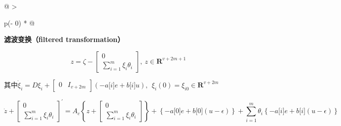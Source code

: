 \documentclass[
  12pt,
  a4paper
]{article}
\begin{document}
\begin{longtable}[]{@{}
  >{\raggedright\arraybackslash}p{}@{}}
\toprule\noalign{}
\begin{minipage}[b]{\linewidth}\raggedright
\textbf{滤波变换（filtered transformation）}

\[z = \zeta - \begin{bmatrix}
0 \\
\sum_{i = 1}^{m}{\xi_{i}\theta_{i}}
\end{bmatrix},\ z \in \mathbf{R}^{v + 2m + 1}\]

其中\({\dot{\xi}}_{i} = D\xi_{i} + \begin{bmatrix}
0 & I_{v + 2m}
\end{bmatrix}\left( - a\lbrack i\rbrack e + b\lbrack i\rbrack u \right),\ \ \xi_{i}(0) = \xi_{i0} \in \mathbf{R}^{v + 2m}\)

\[\dot{z} + \begin{bmatrix}
0 \\
\sum_{i = 1}^{m}{\xi_{i}\theta_{i}}
\end{bmatrix}^{'} = A_{c}\left\{ z + \begin{bmatrix}
0 \\
\sum_{i = 1}^{m}{\xi_{i}\theta_{i}}
\end{bmatrix} \right\} + \left\{ - a\lbrack 0\rbrack e + b\lbrack 0\rbrack(u - \epsilon) \right\} + \sum_{i = 1}^{m}\theta_{i}\left\{ - a\lbrack i\rbrack e + b\lbrack i\rbrack(u - \epsilon) \right\}\]


\end{minipage}
\end{longtable}
\end{document}

